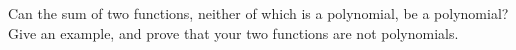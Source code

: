 Can the sum of two functions, neither of which is a polynomial, be a polynomial? Give an example, and prove that your two functions are not polynomials.
